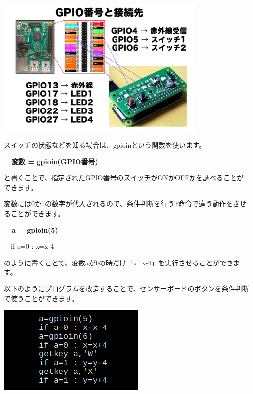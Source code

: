 \documentclass[a4paper,12pt]{jarticle}
\begin{document}
\begin{minipage}{9.781cm}
\centering
{\upshape
\includegraphics[keepaspectratio,width=10.372cm,height=6.89cm]{text04-img/text04-img004.png}}
\end{minipage}

\bigskip
\bigskip
\bigskip

スイッチの状態などを知る場合は、gpioinという関数を使います。


\bigskip

{\bfseries
\ \ 変数 = gpioin(GPIO番号)}


\bigskip

と書くことで、指定されたGPIO番号のスイッチがONかOFFかを調べることができます。

変数には0か1の数字が代入されるので、条件判断を行うif命令で違う動作をさせることができます。


\bigskip

{\bfseries
\ \ a = gpioin(5)

\ \ if a=0 : x=x-4}


\bigskip

のように書くことで、変数aが0の時だけ「x=x-4」を実行させることができます。


\bigskip

以下のようにプログラムを改造することで、センサーボードのボタンを条件判断で使うことができます。

\bigskip
\bigskip

\begin{minipage}{9.781cm}
\centering
{\upshape
\includegraphics[keepaspectratio]{text04-img/text04-img038.png}}
\end{minipage}
\end{document}
